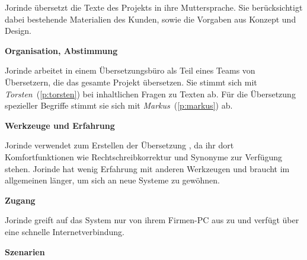\begin{multicols}{2}

\begin{center}
\end{center}


Jorinde übersetzt die Texte des Projekts in ihre Muttersprache. Sie berücksichtigt dabei bestehende Materialien des Kunden, sowie die Vorgaben aus Konzept und Design.

\textbf{Organisation, Abstimmung}

Jorinde arbeitet in einem Übersetzungsbüro als Teil eines Teams von Übersetzern, die das gesamte Projekt übersetzen. Sie stimmt sich mit \emph{Torsten}~(\ref{p:torsten}) bei inhaltlichen Fragen zu Texten ab. Für die Übersetzung spezieller Begriffe stimmt sie sich mit \emph{Markus}~(\ref{p:markus}) ab.

\textbf{Werkzeuge und Erfahrung}

Jorinde verwendet zum Erstellen der Übersetzung , da ihr dort Komfortfunktionen wie Rechtschreibkorrektur und Synonyme zur Verfügung stehen.  Jorinde hat wenig Erfahrung mit anderen Werkzeugen und braucht im allgemeinen länger, um sich an neue Systeme zu gewöhnen.

\textbf{Zugang}

Jorinde greift auf das System nur von ihrem Firmen-PC aus zu und verfügt über eine schnelle Internetverbindung.

\columnbreak

\textbf{Szenarien}


\end{multicols}
